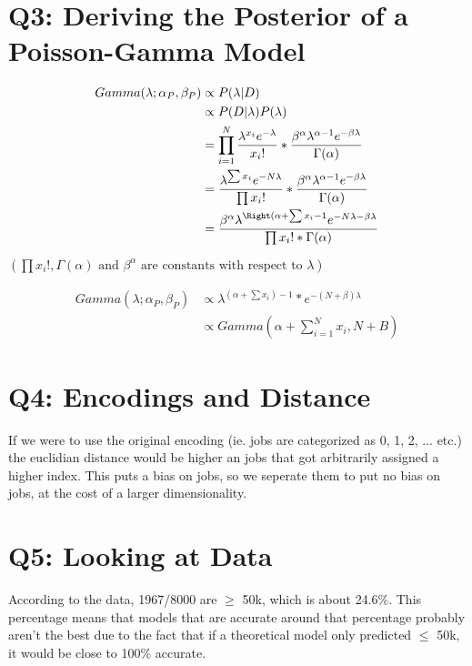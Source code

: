 \documentclass{article}
\begin{document}
    \section*{Q3: Deriving the Posterior of a Poisson-Gamma Model}

        \begin{align*}
            Gamma(\lambda;\alpha_P, \beta_P) &\propto P(\lambda|D)\\
            &\propto P(D|\lambda)P(\lambda)\\
            & = \prod^N_{i=1}\frac{\lambda^{x_i}e^{-\lambda}}{x_i!} * \frac{\beta^\alpha\lambda^{\alpha-1}e^{-\beta\lambda}}{\Gamma(\alpha)}\\
            & = \frac{\lambda^{\sum x_i} e^{-N\lambda}}{\prod x_i!}*\frac{\beta^\alpha\lambda^{\alpha-1}e^{-\beta\lambda}}{\Gamma(\alpha)}\\
            & = \frac{\beta^\alpha\lambda^{\Right( \alpha + \sum x_i- 1} e^{-N\lambda-\beta\lambda}}{\prod x_i!*\Gamma(\alpha)}
        \end{align*}
        \begin{center}$\left(\prod x_i!, \Gamma(\alpha) \text{ and } \beta^\alpha \text{ are constants with respect to } \lambda\right)$\end{center}
        \begin{align*}
            Gamma(\lambda;\alpha_P, \beta_P) &\propto \lambda^{\left(\alpha + \sum x_i\right) - 1}*e^{-(N+\beta)\lambda}\\
            &\propto Gamma\left(\alpha + \sum_{i=1}^N x_i , N+B\right)
        \end{align*}
            
    \section*{Q4: Encodings and Distance}
        \quad If we were to use the original encoding (ie. jobs are categorized as 0, 1, 2, ... etc.) the euclidian distance would be higher an jobs that got arbitrarily assigned a higher index.
        This puts a bias on jobs, so we seperate them to put no bias on jobs, at the cost of a larger dimensionality.
    \section*{Q5: Looking at Data}
        \quad According to the data, 1967/8000 are $\geq$ 50k, which is about 24.6\%. 
        This percentage means that models that are accurate around that percentage probably aren't the best due to the fact that if a theoretical model only predicted $\le$ 50k, it would be close to 100\% accurate.    
\end{document}
